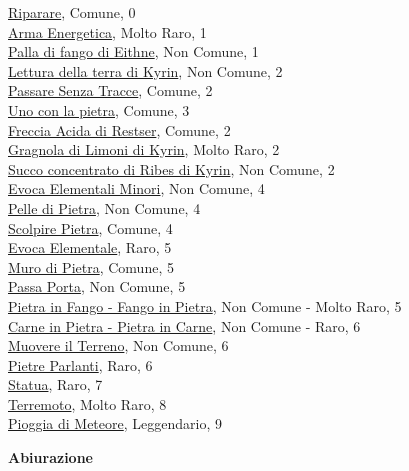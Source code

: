 \begin{multicols}{3}
{{\hyperlink{Riparare}{Riparare}, Comune, 0\\
\hyperlink{Arma Energetica}{Arma Energetica}, Molto Raro, 1\\
\hyperlink{Palla di fango di Eithne}{Palla di fango di Eithne}, Non Comune, 1\\
\hyperlink{Lettura della terra di Kyrin}{Lettura della terra di Kyrin}, Non Comune, 2\\
\hyperlink{Passare Senza Tracce}{Passare Senza Tracce}, Comune, 2\\
\hyperlink{Uno con la pietra}{Uno con la pietra}, Comune, 3\\
\hyperlink{Freccia Acida di Restser}{Freccia Acida di Restser}, Comune, 2\\
\hyperlink{Gragnola di Limoni di Kyrin}{Gragnola di Limoni di Kyrin}, Molto Raro, 2\\
\hyperlink{Succo concentrato di Ribes di Kyrin}{Succo concentrato di Ribes di Kyrin}, Non Comune, 2\\
\hyperlink{Evoca Elementali Minori}{Evoca Elementali Minori}, Non Comune, 4\\
\hyperlink{Pelle di Pietra}{Pelle di Pietra}, Non Comune, 4\\
\hyperlink{Scolpire Pietra}{Scolpire Pietra}, Comune, 4\\
\hyperlink{Evoca Elementale}{Evoca Elementale}, Raro, 5\\
\hyperlink{Muro di Pietra}{Muro di Pietra}, Comune, 5\\
\hyperlink{Passa Porta}{Passa Porta}, Non Comune, 5\\
\hyperlink{Pietra in Fango - Fango in Pietra}{Pietra in Fango - Fango in Pietra}, Non Comune - Molto Raro, 5\\
\hyperlink{Carne in Pietra - Pietra in Carne}{Carne in Pietra - Pietra in Carne}, Non Comune - Raro, 6\\
\hyperlink{Muovere il Terreno}{Muovere il Terreno}, Non Comune, 6\\
\hyperlink{Pietre Parlanti}{Pietre Parlanti}, Raro, 6\\
\hyperlink{Statua}{Statua}, Raro, 7\\
\hyperlink{Terremoto}{Terremoto}, Molto Raro, 8\\
\hyperlink{Pioggia di Meteore}{Pioggia di Meteore}, Leggendario, 9

\medskip\textbf{Abiurazione}

}}
\end{multicols}
